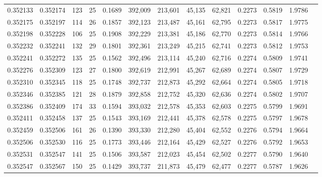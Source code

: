 \begin{tabular}{rrrrrrrrrrrrr}
0.352133 & 0.352174 &   123 &  25 &                                     0.1689 & 392,009 & 213,601 &  45,135 &  62,821 & 0.2273 & 0.5819 & 1.9786 \\
0.352175 & 0.352197 &   114 &  26 &                                     0.1857 & 392,123 & 213,487 &  45,161 &  62,795 & 0.2273 & 0.5817 & 1.9775 \\
0.352198 & 0.352228 &   106 &  25 &                                     0.1908 & 392,229 & 213,381 &  45,186 &  62,770 & 0.2273 & 0.5814 & 1.9766 \\
0.352232 & 0.352241 &   132 &  29 &                                     0.1801 & 392,361 & 213,249 &  45,215 &  62,741 & 0.2273 & 0.5812 & 1.9753 \\
0.352241 & 0.352272 &   135 &  25 &                                     0.1562 & 392,496 & 213,114 &  45,240 &  62,716 & 0.2274 & 0.5809 & 1.9741 \\
0.352276 & 0.352309 &   123 &  27 &                                     0.1800 & 392,619 & 212,991 &  45,267 &  62,689 & 0.2274 & 0.5807 & 1.9729 \\
0.352310 & 0.352345 &   118 &  25 &                                     0.1748 & 392,737 & 212,873 &  45,292 &  62,664 & 0.2274 & 0.5805 & 1.9718 \\
0.352346 & 0.352385 &   121 &  28 &                                     0.1879 & 392,858 & 212,752 &  45,320 &  62,636 & 0.2274 & 0.5802 & 1.9707 \\
0.352386 & 0.352409 &   174 &  33 &                                     0.1594 & 393,032 & 212,578 &  45,353 &  62,603 & 0.2275 & 0.5799 & 1.9691 \\
0.352411 & 0.352458 &   137 &  25 &                                     0.1543 & 393,169 & 212,441 &  45,378 &  62,578 & 0.2275 & 0.5797 & 1.9678 \\
0.352459 & 0.352506 &   161 &  26 &                                     0.1390 & 393,330 & 212,280 &  45,404 &  62,552 & 0.2276 & 0.5794 & 1.9664 \\
0.352506 & 0.352530 &   116 &  25 &                                     0.1773 & 393,446 & 212,164 &  45,429 &  62,527 & 0.2276 & 0.5792 & 1.9653 \\
0.352531 & 0.352547 &   141 &  25 &                                     0.1506 & 393,587 & 212,023 &  45,454 &  62,502 & 0.2277 & 0.5790 & 1.9640 \\
0.352547 & 0.352567 &   150 &  25 &                                     0.1429 & 393,737 & 211,873 &  45,479 &  62,477 & 0.2277 & 0.5787 & 1.9626 \\

\end{tabular}
